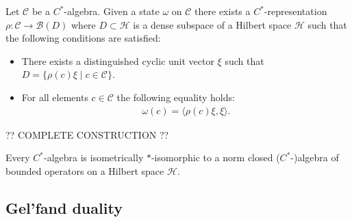 
    \begin{construct}\label{operators:gns}
        Let $\mathcal{C}$ be a $C^*$-algebra. Given a state $\omega$ on $\mathcal{C}$ there exists a $C^*$-representation $\rho:\mathcal{C}\rightarrow\mathcal{B}(D)$ where $D\subset\mathcal{H}$ is a dense subspace of a Hilbert space $\mathcal{H}$ such that the following conditions are satisfied:
        \begin{itemize}
            \item There exists a distinguished cyclic unit vector $\xi$ such that $D = \{\rho(c)\xi\mid c\in\mathcal{C}\}$.
            \item For all elements $c\in\mathcal{C}$ the following equality holds:
                \begin{gather}
                    \omega(c) = \langle\rho(c)\xi,\xi\rangle.
                \end{gather}
        \end{itemize}

        ?? COMPLETE CONSTRUCTION ??
    \end{construct}

    \begin{theorem}
        Every $C^*$-algebra is isometrically $\ast$-isomorphic to a norm closed ($C^*$-)algebra of bounded operators on a Hilbert space $\mathcal{H}$.
    \end{theorem}

\subsection{Gel'fand duality}

